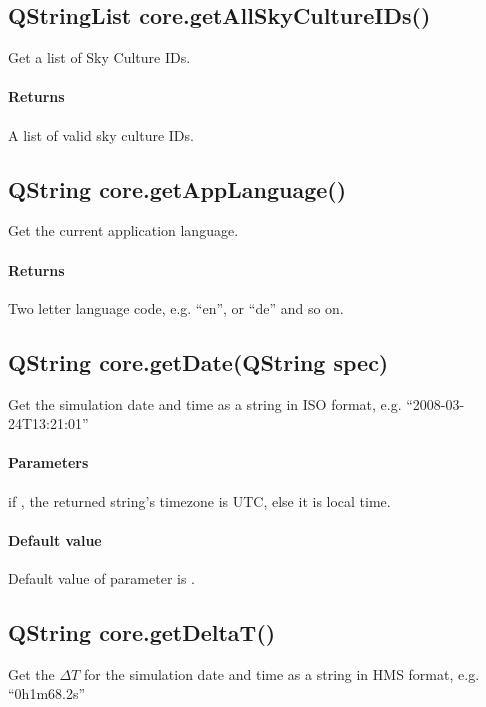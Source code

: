 \subsection{QStringList core.getAllSkyCultureIDs()}
\label{sec:ScriptingAPI:core:getAllSkyCultureIDs}
Get a list of Sky Culture IDs.

\paragraph{Returns}
A list of valid sky culture IDs.

\subsection{QString core.getAppLanguage()}
\label{sec:ScriptingAPI:core:getAppLanguage}
Get the current application language.

\paragraph{Returns}
Two letter language code, e.g. ``en'', or ``de'' and so on.

\subsection{QString core.getDate(QString spec)}
\label{sec:ScriptingAPI:core:getDate}
Get the simulation date and time as a string in ISO format, e.g. ``2008-03-24T13:21:01''

\paragraph{Parameters}
\begin{description}[align=right,labelwidth=3cm,leftmargin=3.2cm]
\item[\parameter{spec}] if , the returned string's timezone is UTC, else it is local time.
\end{description}

\paragraph{Default value}
Default value of parameter is .

\subsection{QString core.getDeltaT()}
\label{sec:ScriptingAPI:core:getDeltaT}
Get the $\Delta T$ for the simulation date and time as a string in HMS format, e.g. ``0h1m68.2s''

